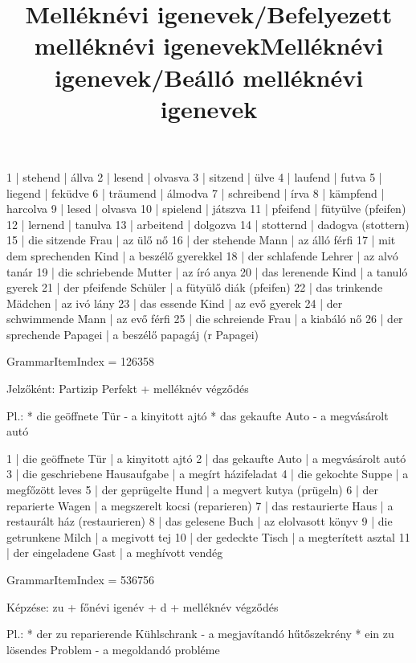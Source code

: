 \begin{exmp}
1 | stehend | állva
2 | lesend | olvasva
3 | sitzend | ülve
4 | laufend | futva
5 | liegend | feküdve
6 | träumend | álmodva
7 | schreibend | írva
8 | kämpfend | harcolva
9 | lesed | olvasva
10 | spielend | játszva
11 | pfeifend | fütyülve (pfeifen)
12 | lernend | tanulva
13 | arbeitend | dolgozva
14 | stotternd | dadogva (stottern)
15 | die sitzende Frau | az ülő nő
16 | der stehende Mann | az álló férfi
17 | mit dem sprechenden Kind | a beszélő gyerekkel
18 | der schlafende Lehrer | az alvó tanár
19 | die schriebende Mutter | az író anya
20 | das lerenende Kind | a tanuló gyerek
21 | der pfeifende Schüler | a fütyülő diák (pfeifen)
22 | das trinkende Mädchen | az ivó lány
23 | das essende Kind | az evő gyerek
24 | der schwimmende Mann | az evő férfi
25 | die schreiende Frau | a kiabáló nő
26 | der sprechende Papagei | a beszélő papagáj (r Papagei)
\end{exmp}

\title{Melléknévi igenevek/Befelyezett melléknévi igenevek}

GrammarItemIndex = 126358

\begin{desc}
Jelzőként: Partizip Perfekt + melléknév végződés

Pl.: * die geöffnete Tür - a kinyitott ajtó
* das gekaufte Auto - a megvásárolt autó
\end{desc}

\begin{exmp}
1 | die geöffnete Tür | a kinyitott ajtó
2 | das gekaufte Auto | a megvásárolt autó
3 | die geschriebene Hausaufgabe | a megírt házifeladat
4 | die gekochte Suppe | a megfőzött leves
5 | der geprügelte Hund | a megvert kutya (prügeln)
6 | der reparierte Wagen | a megszerelt kocsi (reparieren)
7 | das restaurierte Haus | a restaurált ház (restaurieren)
8 | das gelesene Buch | az elolvasott könyv
9 | die getrunkene Milch | a megivott tej
10 | der gedeckte Tisch | a megterített asztal
11 | der eingeladene Gast | a meghívott vendég
\end{exmp}

\title{Melléknévi igenevek/Beálló melléknévi igenevek}

GrammarItemIndex = 536756

\begin{desc}
Képzése: zu + főnévi igenév + d + melléknév végződés

Pl.: * der zu reparierende Kühlschrank - a megjavítandó hűtőszekrény
* ein zu lösendes Problem - a megoldandó probléme
\end{desc}

